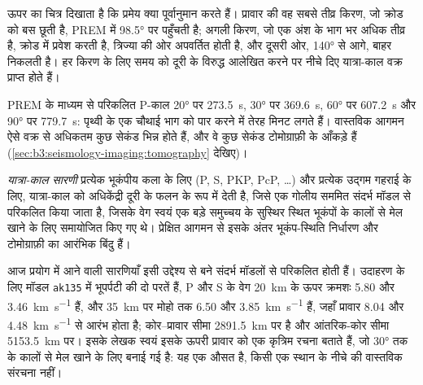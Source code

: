ऊपर का चित्र दिखाता है कि प्रमेय क्या पूर्वानुमान करते हैं। प्रावार की वह सबसे तीव्र किरण, जो
क्रोड को बस छूती है, PREM में \ang{98.5} पर पहुँचती है; अगली किरण, जो एक अंश के
भाग भर अधिक तीव्र है, क्रोड में प्रवेश करती है, त्रिज्या की ओर अपवर्तित होती है, और
दूसरी ओर, \ang{140} से आगे, बाहर निकलती है। हर किरण के लिए समय को दूरी के विरुद्ध
आलेखित करने पर नीचे दिए यात्रा-काल वक्र प्राप्त होते हैं।

PREM के माध्यम से परिकलित P-काल \ang{20} पर \qty{273.5}{s},
\ang{30} पर \qty{369.6}{s}, \ang{60} पर \qty{607.2}{s} और
\ang{90} पर \qty{779.7}{s}: पृथ्वी के एक चौथाई भाग को पार करने में तेरह मिनट लगते हैं।
वास्तविक आगमन ऐसे वक्र से अधिकतम कुछ सेकंड भिन्न होते हैं, और वे कुछ सेकंड
टोमोग्राफ़ी के आँकड़े हैं (\cref{sec:b3:seismology-imaging:tomography} देखिए)।

\begin{definition}[यात्रा-काल सारणी]\label{def:b3:seismology-imaging:tables}
\emph{यात्रा-काल सारणी} प्रत्येक भूकंपीय कला के लिए
(P, S, PKP, PcP, \dots) और प्रत्येक उद्गम गहराई के लिए, यात्रा-काल को
अधिकेंद्री दूरी के फलन के रूप में देती है, जिसे एक गोलीय सममित
संदर्भ मॉडल से परिकलित किया जाता है, जिसके वेग स्वयं एक बड़े
समुच्चय के सुस्थिर स्थित भूकंपों के कालों से मेल खाने के लिए समायोजित किए गए थे। प्रेक्षित
आगमन से इसके अंतर भूकंप-स्थिति निर्धारण और टोमोग्राफ़ी का आरंभिक बिंदु हैं।
\end{definition}

आज प्रयोग में आने वाली सारणियाँ इसी उद्देश्य से बने संदर्भ मॉडलों से परिकलित
होती हैं। उदाहरण के लिए मॉडल \texttt{ak135} में भूपर्पटी की दो परतें हैं,
P और S के वेग \qty{20}{km} के ऊपर क्रमशः 5.80 और \qty{3.46}{km.s^{-1}} हैं, और
\qty{35}{km} पर मोहो तक 6.50 और \qty{3.85}{km.s^{-1}} हैं, जहाँ
प्रावार 8.04 और \qty{4.48}{km.s^{-1}} से आरंभ होता है; कोर–प्रावार सीमा
\qty{2891.5}{km} पर है और आंतरिक-कोर सीमा \qty{5153.5}{km} पर।
इसके लेखक स्वयं इसके ऊपरी प्रावार को एक कृत्रिम रचना बताते हैं,
जो \ang{30} तक के कालों से मेल खाने के लिए बनाई गई है: यह एक औसत है, किसी
एक स्थान के नीचे की वास्तविक संरचना नहीं।

